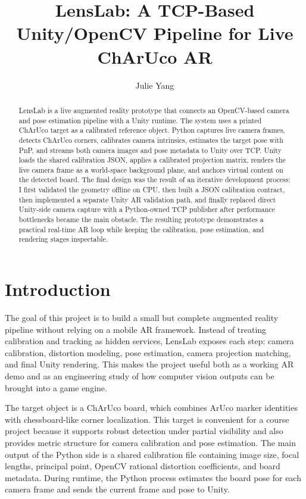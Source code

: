 \documentclass[10pt,twocolumn,letterpaper]{article}
\begin{document}
\title{LensLab: A TCP-Based Unity/OpenCV Pipeline for Live ChArUco AR}

\author{
Julie Yang
}
\maketitle

\begin{abstract}
LensLab is a live augmented reality prototype that connects an OpenCV-based
camera and pose estimation pipeline with a Unity runtime.  The system uses a
printed ChArUco target as a calibrated reference object.  Python captures live
camera frames, detects ChArUco corners, calibrates camera intrinsics, estimates
the target pose with PnP, and streams both camera images and pose metadata to
Unity over TCP.  Unity loads the shared calibration JSON, applies a calibrated
projection matrix, renders the live camera frame as a world-space background
plane, and anchors virtual content on the detected board.  The final design was
the result of an iterative development process: I first validated the geometry
offline on CPU, then built a JSON calibration contract, then implemented a
separate Unity AR validation path, and finally replaced direct Unity-side camera
capture with a Python-owned TCP publisher after performance bottlenecks became
the main obstacle.  The resulting prototype demonstrates a practical real-time
AR loop while keeping the calibration, pose estimation, and rendering stages
inspectable.
\end{abstract}

\section{Introduction}

The goal of this project is to build a small but complete augmented reality
pipeline without relying on a mobile AR framework.  Instead of treating
calibration and tracking as hidden services, LensLab exposes each step: camera
calibration, distortion modeling, pose estimation, camera projection matching,
and final Unity rendering.  This makes the project useful both as a working AR
demo and as an engineering study of how computer vision outputs can be brought
into a game engine.

The target object is a ChArUco board, which combines ArUco marker identities
with chessboard-like corner localization.  This target is convenient for a
course project because it supports robust detection under partial visibility and
also provides metric structure for camera calibration and pose estimation.  The
main output of the Python side is a shared calibration file containing image
size, focal lengths, principal point, OpenCV rational distortion coefficients,
and board metadata.  During runtime, the Python process estimates the board pose
for each camera frame and sends the current frame and pose to Unity.
\end{document}
